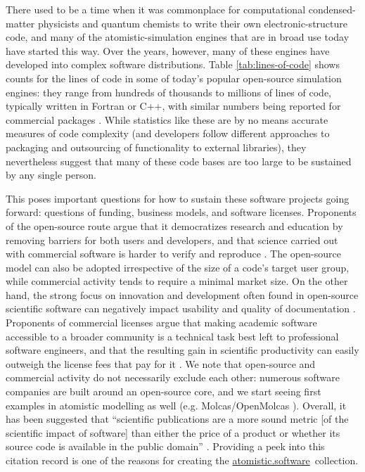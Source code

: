 \documentclass[9pt,review]{livecoms}
\newcommand{\atsoft}{\href{https://atomistic.software}{atomistic.software}\ }
\begin{document}
There used to be a time when it was commonplace for computational condensed-matter physicists and quantum chemists to write their own electronic-structure code, and many of the atomistic-simulation engines that are in broad use today have started this way.
Over the years, however, many of these engines have developed into complex software distributions.
Table \ref{tab:lines-of-code} shows counts for the lines of code in some of today's popular open-source simulation engines: they range from hundreds of thousands to millions of lines of code, typically written in Fortran or C++, with similar numbers being reported for commercial packages \cite{Krylov2015}.
While statistics like these are by no means accurate measures of code complexity (and developers follow different approaches to packaging and outsourcing of functionality to external libraries), they nevertheless suggest that many of these code bases are too large to be sustained by any single person.

This poses important questions for how to sustain these software projects going forward: questions of funding, business models, and software licenses.
Proponents of the open-source route argue that it democratizes research and education by removing barriers for both users and developers, and that science carried out with commercial software is harder to verify and reproduce \cite{Stodden2009,Gezelter2015,Lehtola2021}.
The open-source model can also be adopted irrespective of the size of a code's target user group, while commercial activity tends to require a minimal market size.
On the other hand, the strong focus on innovation and development often found in open-source scientific software can negatively impact usability and quality of documentation \cite{Swarts2019}.
Proponents of commercial licenses argue that making academic software accessible to a broader community is a technical task best left to professional software engineers, and that the resulting gain in scientific productivity can easily outweigh the license fees that pay for it \cite{Krylov2015}.
We note that open-source and commercial activity do not necessarily exclude each other: numerous software companies are built around an open-source core, and we start seeing first examples in atomistic modelling as well (e.g. Molcas/OpenMolcas \cite{Fdez.Galvan2019}).
Overall, it has been suggested that ``scientific publications are a more sound metric [of the scientific impact of software] than either the price of a product or whether its source code is available in the public domain'' \cite{Krylov2015}.
Providing a peek into this citation record is one of the reasons for creating the \atsoft collection.
\end{document}

